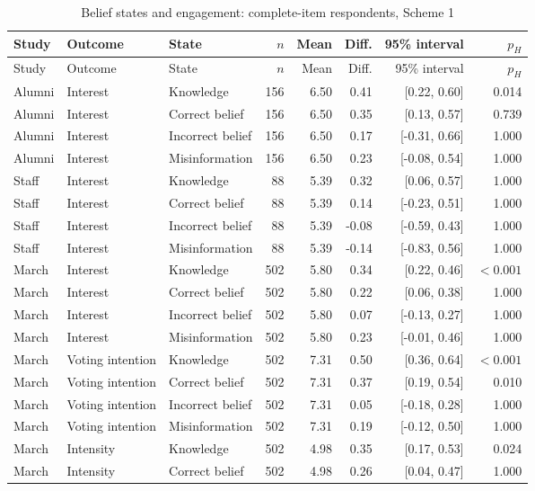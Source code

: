 \begin{longtable}{lllrrrrr}
\caption{Belief states and engagement: complete-item respondents, Scheme 1}\label{tab:engagement}\\
\toprule
Study & Outcome & State & $n$ & Mean & Diff. & 95\% interval & $p_H$ \\
\midrule
\endfirsthead
\toprule
Study & Outcome & State & $n$ & Mean & Diff. & 95\% interval & $p_H$ \\
\midrule
\endhead
\bottomrule
\endlastfoot
Alumni & Interest & Knowledge & 156 & 6.50 & 0.41 & [0.22, 0.60] & 0.014 \\
Alumni & Interest & Correct belief & 156 & 6.50 & 0.35 & [0.13, 0.57] & 0.739 \\
Alumni & Interest & Incorrect belief & 156 & 6.50 & 0.17 & [-0.31, 0.66] & 1.000 \\
Alumni & Interest & Misinformation & 156 & 6.50 & 0.23 & [-0.08, 0.54] & 1.000 \\
Staff & Interest & Knowledge &  88 & 5.39 & 0.32 & [0.06, 0.57] & 1.000 \\
Staff & Interest & Correct belief &  88 & 5.39 & 0.14 & [-0.23, 0.51] & 1.000 \\
Staff & Interest & Incorrect belief &  88 & 5.39 & -0.08 & [-0.59, 0.43] & 1.000 \\
Staff & Interest & Misinformation &  88 & 5.39 & -0.14 & [-0.83, 0.56] & 1.000 \\
March & Interest & Knowledge & 502 & 5.80 & 0.34 & [0.22, 0.46] & $<0.001$ \\
March & Interest & Correct belief & 502 & 5.80 & 0.22 & [0.06, 0.38] & 1.000 \\
March & Interest & Incorrect belief & 502 & 5.80 & 0.07 & [-0.13, 0.27] & 1.000 \\
March & Interest & Misinformation & 502 & 5.80 & 0.23 & [-0.01, 0.46] & 1.000 \\
March & Voting intention & Knowledge & 502 & 7.31 & 0.50 & [0.36, 0.64] & $<0.001$ \\
March & Voting intention & Correct belief & 502 & 7.31 & 0.37 & [0.19, 0.54] & 0.010 \\
March & Voting intention & Incorrect belief & 502 & 7.31 & 0.05 & [-0.18, 0.28] & 1.000 \\
March & Voting intention & Misinformation & 502 & 7.31 & 0.19 & [-0.12, 0.50] & 1.000 \\
March & Intensity & Knowledge & 502 & 4.98 & 0.35 & [0.17, 0.53] & 0.024 \\
March & Intensity & Correct belief & 502 & 4.98 & 0.26 & [0.04, 0.47] & 1.000 \\

\end{longtable}
